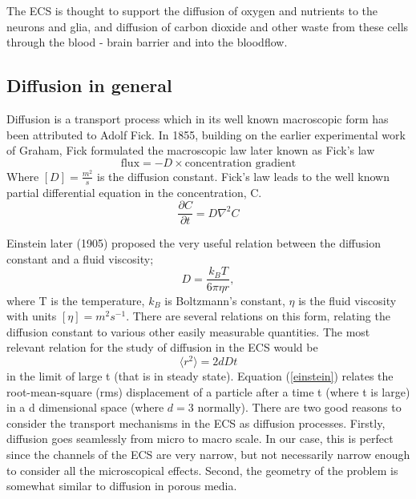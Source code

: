 \documentclass[a4paper,english, 12pt, twoside]{article}
\renewcommand{\d}{\partial}
\begin{document}
The ECS is thought to support the diffusion of oxygen and nutrients to the neurons and glia, and diffusion of carbon dioxide and other waste from these cells through the blood - brain barrier and into the bloodflow. 

\subsection{Diffusion in general}
Diffusion is a transport process which in its well known macroscopic form has been attributed to Adolf Fick. 
In 1855, building on the earlier experimental work of Graham, Fick formulated the macroscopic law later known as Fick's law
\begin{equation}
 \text{flux} = -D\times\text{concentration gradient}
\end{equation}
Where $[D] = \frac{m^2}{s}$ is the diffusion constant. Fick's law leads to the well known partial differential equation in the concentration, C.
\begin{equation}\label{diffusion_eq}
 \frac{\d C}{\d t} = D\nabla^2C
\end{equation}

Einstein later (1905) proposed the very useful relation between the diffusion constant and a fluid viscosity; 
\begin{equation}\label{einstein_viscosity}
D = \frac{k_B T}{6\pi \eta r},
\end{equation}
where T is the temperature, $k_B$ is Boltzmann's constant, $\eta$ is the fluid viscosity with units $[\eta] = m^2s^{-1}$.
There are several relations on this form, relating the diffusion constant to various other easily measurable quantities. 
The most relevant relation for the study of diffusion in the ECS would be
\begin{equation}\label{einstein}
 \langle r^2\rangle = 2dDt
\end{equation}
in the limit of large t (that is in steady state). 
Equation (\ref{einstein}) relates the root-mean-square (rms) displacement of a particle after a time t (where t is large) in a d dimensional space (where $d=3$ normally). 
There are two good reasons to consider the transport mechanisms in the ECS as diffusion processes. 
Firstly, diffusion goes seamlessly from micro to macro scale. 
In our case, this is perfect since the channels of the ECS are very narrow, but not necessarily narrow enough to consider all the microscopical effects. 
Second, the geometry of the problem is somewhat similar to diffusion in porous media.\\
\end{document}
